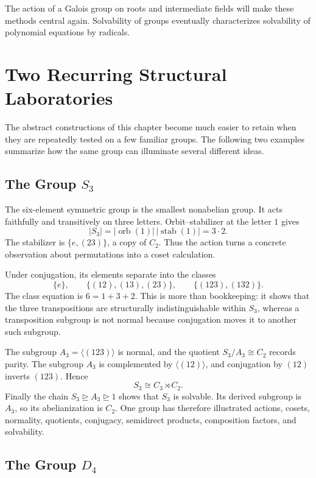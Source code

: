 \begin{remark}
The action of a Galois group on roots and intermediate fields will make these
methods central again.  Solvability of groups eventually characterizes
solvability of polynomial equations by radicals.
\end{remark}

\section{Two Recurring Structural Laboratories}

The abstract constructions of this chapter become much easier to retain when
they are repeatedly tested on a few familiar groups.  The following two
examples summarize how the same group can illuminate several different ideas.

\subsection*{The Group \(S_3\)}

The six-element symmetric group is the smallest nonabelian group.  It acts
faithfully and transitively on three letters. Orbit--stabilizer at the letter
\(1\) gives
\[|S_3|=|\operatorname{orb}(1)|\,|\operatorname{stab}(1)|=3\cdot2.\]
The stabilizer is \(\{e,(23)\}\), a copy of \(C_2\). Thus the action turns a
concrete observation about permutations into a coset calculation.

Under conjugation, its elements separate into the classes
\[\{e\},\qquad\{(12),(13),(23)\},\qquad\{(123),(132)\}.
\]
The class equation is \(6=1+3+2\).  This is more than bookkeeping: it shows
that the three transpositions are structurally indistinguishable within
\(S_3\), whereas a transposition subgroup is not normal because conjugation
moves it to another such subgroup.

The subgroup \(A_3=\langle(123)\rangle\) is normal, and the quotient
\(S_3/A_3\cong C_2\) records parity.  The subgroup \(A_3\) is complemented by
\(\langle(12)\rangle\), and conjugation by \((12)\) inverts \((123)\).  Hence
\[S_3\cong C_3\rtimes C_2.\]
Finally the chain \(S_3\trianglerighteq A_3\trianglerighteq1\) shows that
\(S_3\) is solvable.  Its derived subgroup is \(A_3\), so its abelianization
is \(C_2\).  One group has therefore illustrated actions, cosets, normality,
quotients, conjugacy, semidirect products, composition factors, and
solvability.

\subsection*{The Group \(D_4\)}

